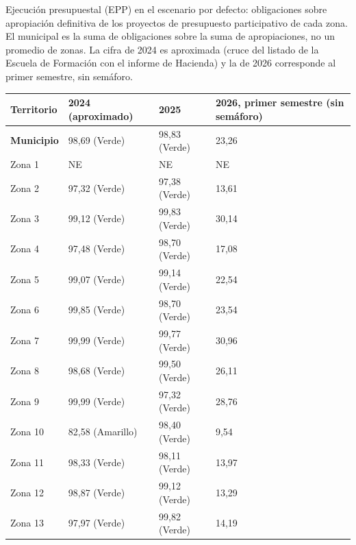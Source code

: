\documentclass[11pt,letterpaper]{article}
\begin{document}
Ejecución presupuestal (EPP) en el escenario por defecto: obligaciones sobre apropiación definitiva de los proyectos de presupuesto participativo de cada zona. El municipal es la suma de obligaciones sobre la suma de apropiaciones, no un promedio de zonas. La cifra de 2024 es aproximada (cruce del listado de la Escuela de Formación con el informe de Hacienda) y la de 2026 corresponde al primer semestre, sin semáforo.

\begin{center}\footnotesize\begin{tabularx}{\linewidth}{L{3cm}YYY}\toprule

\textbf{Territorio} & \textbf{2024 (aproximado)} & \textbf{2025} & \textbf{2026, primer semestre (sin semáforo)} \\ \midrule

\textbf{Municipio} & 98,69 (Verde) & 98,83 (Verde) & 23,26 \\
Zona 1 & NE & NE & NE \\
Zona 2 & 97,32 (Verde) & 97,38 (Verde) & 13,61 \\
Zona 3 & 99,12 (Verde) & 99,83 (Verde) & 30,14 \\
Zona 4 & 97,48 (Verde) & 98,70 (Verde) & 17,08 \\
Zona 5 & 99,07 (Verde) & 99,14 (Verde) & 22,54 \\
Zona 6 & 99,85 (Verde) & 98,70 (Verde) & 23,54 \\
Zona 7 & 99,99 (Verde) & 99,77 (Verde) & 30,96 \\
Zona 8 & 98,68 (Verde) & 99,50 (Verde) & 26,11 \\
Zona 9 & 99,99 (Verde) & 97,32 (Verde) & 28,76 \\
Zona 10 & 82,58 (Amarillo) & 98,40 (Verde) & 9,54 \\
Zona 11 & 98,33 (Verde) & 98,11 (Verde) & 13,97 \\
Zona 12 & 98,87 (Verde) & 99,12 (Verde) & 13,29 \\
Zona 13 & 97,97 (Verde) & 99,82 (Verde) & 14,19 \\ \bottomrule\end{tabularx}\end{center}
\end{document}
